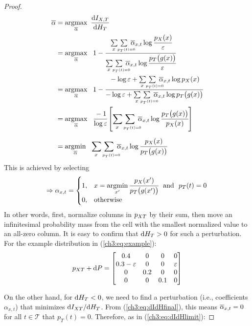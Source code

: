 \begin{proof}
\allowdisplaybreaks
\begin{align*}
    \abar 
    &= \argmax_{\abar} \ \frac{\dif{I_{X,T}}}{\dif{H_T}} \\
    &= \argmax_{\abar} \ \ 1 - \cfrac{\doublesum{x}{\ \ p_T(t)=0}  \abar_{x,t} \log \cfrac{p_X(x)}{\dpp} }{ \doublesum{x}{\ \ p_T(t)=0}  \abar_{x,t} \log \cfrac{p_T\big( g(x)\big)}{\dpp}} \\
    &= \argmax_{\abar} \ \ 1 - \cfrac{ - \log\dpp + \doublesum{x}{\ \ p_T(t)=0} \abar_{x,t} \log p_X(x) }{ - \log\dpp + \doublesum{x}{\ \ p_T(t)=0} \abar_{x,t} \log {p_T\big( g(x)\big)}} \\
    &= \argmax_{\abar} \ \ \cfrac{-1}{\log\dpp} 
    \left[ \doublesum{x}{\ \ p_T(t)=0} \abar_{x,t} \log\cfrac{p_T\big( g(x)\big)}{p_X(x)} \right] \\[5pt]
    &= \argmin_{\abar} \ \ \doublesum{x}{\ \ p_T(t)=0} \abar_{x,t} \log\cfrac{p_X(x)}{p_T\big( g(x)\big)}
\end{align*}
This is achieved by selecting
\begin{align}
    \Rightarrow \alpha_{x,t} = 
    \begin{cases}
        1, & x=\operatorname*{argmin}\limits_{x'} \cfrac{p_X(x')}{p_T\big(g(x')\big)} \ \text{ and } \ p_T(t)=0  \\
        0, & \text{otherwise}
    \end{cases}
\end{align}
In other words, first, normalize columns in $ p_{XT} $ by their sum, then move an infinitesimal probability mass from the cell with the smallest normalized value to an all-zero column. It is easy to confirm that $\text{d}{H}_T > 0$ for such a perturbation. For the example distribution in (\ref{ch3:eq:example}):
\begin{align}
    p_{XT} + \text{d}{P} = 
    \begin{bmatrix}
        0.4 & 0 & 0 & 0 \\
        0.3-\varepsilon & 0 & 0 & \varepsilon \\
        0 & 0.2 & 0 & 0 \\
        0 & 0 & 0.1 & 0 \\
    \end{bmatrix}
\end{align}

On the other hand, for $ \text{d}{H_T}<0 $, we need to find a perturbation (i.e., coefficients $ \alpha_{x,t} $) that minimizes $ \text{d}{I_{XT}} / \text{d}{H_T} $. From (\ref{ch3:eq:dIdHfinal}), this means $\overline{\alpha}_{x,t} = 0$ for all $t\in\mathcal{T}$ that $p_T(t)=0$. Therefore, as in (\ref{ch3:eq:dIdHlimit}):


\end{proof}
